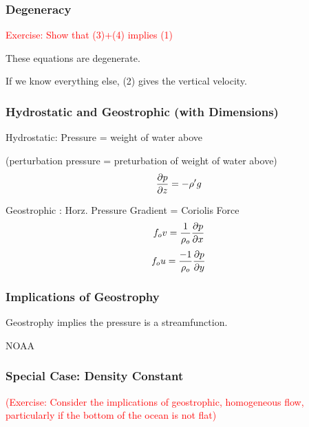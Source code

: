 \documentclass[xcolor=dvipsnames]{beamer}
\begin{document}
\begin{frame}
\frametitle{Degeneracy}

\textcolor{red}{Exercise: Show that (3)+(4) implies (1)}

These equations are degenerate. 

If we know everything else, (2) gives the vertical velocity.
\end{frame}

\begin{frame}
\frametitle{Hydrostatic and Geostrophic (with Dimensions)}

Hydrostatic: Pressure = weight of water above

(perturbation pressure = preturbation of weight of water above)
\[ \frac {\partial p}{\partial z} = - \rho^\prime g \]

Geostrophic : Horz. Pressure Gradient = Coriolis Force
\[ f_o v = \frac{1}{\rho_o} \frac {\partial p}{\partial x} \]
\[ f_o u = \frac{-1}{\rho_o} \frac {\partial p}{\partial y} \]
\end{frame}

\begin{frame}
\frametitle{Implications of Geostrophy}
\label{ssh_image}

Geostrophy implies the pressure is a streamfunction.

NOAA

\end{frame}

\begin{frame}
\frametitle{Special Case: Density Constant}

\textcolor{red}{(Exercise: Consider the implications of geostrophic, homogeneous flow, particularly if the bottom of the ocean is not flat)}
\end{frame}
\end{document}
